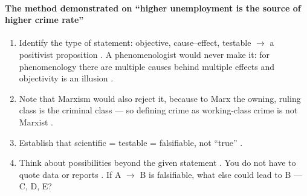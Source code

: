 \paragraph{The method demonstrated on ``higher unemployment is the source of higher crime rate''}
\begin{enumerate}
    \item Identify the type of statement: objective, cause--effect, testable $\rightarrow$ a positivist proposition . A phenomenologist would never make it: for phenomenology there are multiple causes behind multiple effects and objectivity is an illusion .
    \item Note that Marxism would also reject it, because to Marx the owning, ruling class is the criminal class --- so defining crime as working-class crime is not Marxist .
    \item Establish that scientific = testable = falsifiable, not ``true'' .
    \item Think about possibilities beyond the given statement . You do not have to quote data or reports . If A $\rightarrow$ B is falsifiable, what else could lead to B --- C, D, E? 
\end{enumerate}

